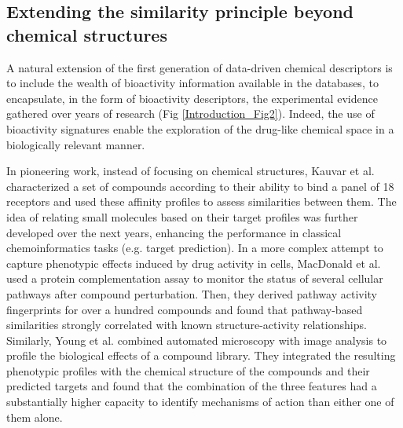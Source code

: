 \subsection{Extending the similarity principle beyond chemical structures}
\label{Introduction_extending}

A natural extension of the first generation of data-driven chemical descriptors is to include the wealth of bioactivity information available in the databases, to encapsulate, in the form of bioactivity descriptors, the experimental evidence gathered over years of research (Fig \ref{Introduction_Fig2}). Indeed, the use of bioactivity signatures enable the exploration of the drug-like chemical space in a biologically relevant manner. 

In pioneering work, instead of focusing on chemical structures, Kauvar et al. \cite{kauvar_predicting_1995} characterized a set of compounds according to their ability to bind a panel of 18 receptors and used these affinity profiles to assess similarities between them. The idea of relating small molecules based on their target profiles was further developed over the next years\cite{paolini_global_2006, keiser_predicting_2009}, enhancing the performance in classical chemoinformatics tasks (e.g. target prediction). In a more complex attempt to capture phenotypic effects induced by drug activity in cells, MacDonald et al. \cite{macdonald_identifying_2006} used a protein complementation assay to monitor the status of several cellular pathways after compound perturbation. Then, they derived pathway activity fingerprints for over a hundred compounds and found that pathway-based similarities strongly correlated with known structure-activity relationships. Similarly, Young et al. \cite{young_integrating_2008} combined automated microscopy with image analysis to profile the biological effects of a compound library. They integrated the resulting phenotypic profiles with the chemical structure of the compounds and their predicted targets and found that the combination of the three features had a substantially higher capacity to identify mechanisms of action than either one of them alone.

